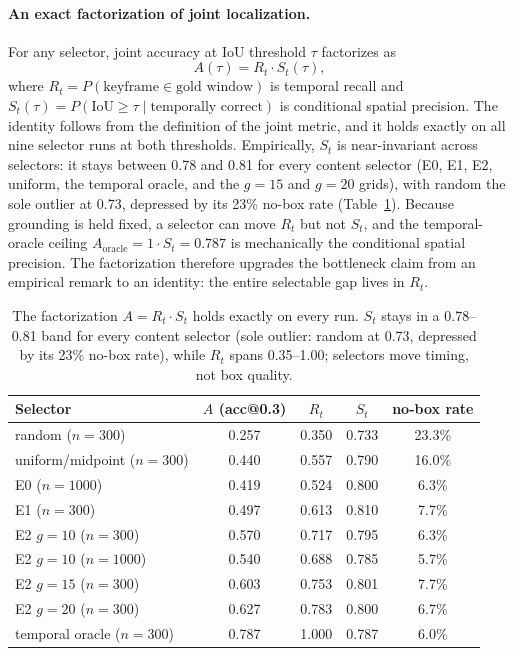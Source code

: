 \paragraph{An exact factorization of joint localization.} For any selector, joint accuracy at IoU threshold $\tau$ factorizes as
\begin{equation}
A(\tau) = R_t \cdot S_t(\tau),
\end{equation}
where $R_t = P(\text{keyframe} \in \text{gold window})$ is temporal recall and $S_t(\tau) = P(\mathrm{IoU} \ge \tau \mid \text{temporally correct})$ is conditional spatial precision. The identity follows from the definition of the joint metric, and it holds exactly on all nine selector runs at both thresholds. Empirically, $S_t$ is near-invariant across selectors: it stays between 0.78 and 0.81 for every content selector (E0, E1, E2, uniform, the temporal oracle, and the $g=15$ and $g=20$ grids), with random the sole outlier at 0.73, depressed by its 23\% no-box rate (Table~\ref{tab:factorization}). Because grounding is held fixed, a selector can move $R_t$ but not $S_t$, and the temporal-oracle ceiling $A_{\mathrm{oracle}} = 1 \cdot S_t = 0.787$ is mechanically the conditional spatial precision. The factorization therefore upgrades the bottleneck claim from an empirical remark to an identity: the entire selectable gap lives in $R_t$.

\begin{table}[htbp]
\centering
\begin{tabular}{lcccc}
\toprule
Selector & $A$ (acc@0.3) & $R_t$ & $S_t$ & no-box rate \\
\midrule
random ($n=300$) & 0.257 & 0.350 & 0.733 & 23.3\% \\
uniform/midpoint ($n=300$) & 0.440 & 0.557 & 0.790 & 16.0\% \\
E0 ($n=1000$) & 0.419 & 0.524 & 0.800 & 6.3\% \\
E1 ($n=300$) & 0.497 & 0.613 & 0.810 & 7.7\% \\
E2 $g=10$ ($n=300$) & 0.570 & 0.717 & 0.795 & 6.3\% \\
E2 $g=10$ ($n=1000$) & 0.540 & 0.688 & 0.785 & 5.7\% \\
E2 $g=15$ ($n=300$) & 0.603 & 0.753 & 0.801 & 7.7\% \\
E2 $g=20$ ($n=300$) & 0.627 & 0.783 & 0.800 & 6.7\% \\
temporal oracle ($n=300$) & 0.787 & 1.000 & 0.787 & 6.0\% \\
\bottomrule
\end{tabular}
\caption{The factorization $A = R_t \cdot S_t$ holds exactly on every run. $S_t$ stays in a 0.78--0.81 band for every content selector (sole outlier: random at 0.73, depressed by its 23\% no-box rate), while $R_t$ spans 0.35--1.00; selectors move timing, not box quality.}
\label{tab:factorization}
\end{table}

